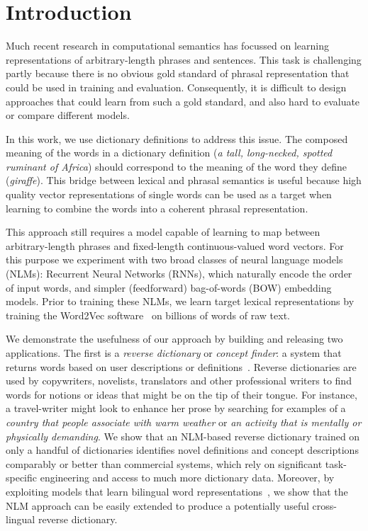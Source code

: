 \label{CH4}
\section{Introduction}

Much recent research in computational semantics has focussed on learning representations of arbitrary-length phrases and sentences. This task is challenging partly because there is no obvious gold standard of phrasal representation that could be used in training and evaluation. Consequently, it is difficult to design approaches that could learn from such a gold standard, and also hard to evaluate or compare different models.

In this work, we use dictionary definitions to address this issue. The composed meaning of the words in a dictionary definition (\emph{a tall, long-necked, spotted ruminant of Africa}) should correspond to the meaning of the word they define (\emph{giraffe}). This bridge between lexical and phrasal semantics is useful because high quality vector representations of single words can be used as a target when learning to combine the words into a coherent phrasal representation.
 
This approach still requires a model capable of learning to map between arbitrary-length phrases and fixed-length continuous-valued word vectors. For this purpose we experiment with two broad classes of neural language models (NLMs): Recurrent Neural Networks (RNNs), which naturally encode the order of input words, and simpler (feedforward) bag-of-words (BOW) embedding models. Prior to training these NLMs, we learn target lexical representations by training the Word2Vec software~\cite{mikolov2013distributed} on billions of words of raw text. 

We demonstrate the usefulness of our approach by building and releasing two applications. The first is a \emph{reverse dictionary} or \emph{concept finder}: a system that returns words based on user descriptions or definitions~\cite{zock2004word}. Reverse dictionaries are used by copywriters, novelists, translators and other professional writers to find words for notions or ideas that might be on the tip of their tongue. For instance, a travel-writer might look to enhance her prose by searching for examples of a \emph{country that people associate with warm weather} or \emph{an activity that is mentally or physically demanding}. We show that an NLM-based reverse dictionary trained on only a handful of dictionaries identifies novel definitions and concept descriptions comparably or better than commercial systems, which rely on significant task-specific engineering and access to much more dictionary data. Moreover, by exploiting models that learn bilingual word representations~\cite{307754,Klementiev,hermann2013multilingual,gouws2014bilbowa}, we show that the NLM approach can be easily extended to produce a potentially useful cross-lingual reverse dictionary.

